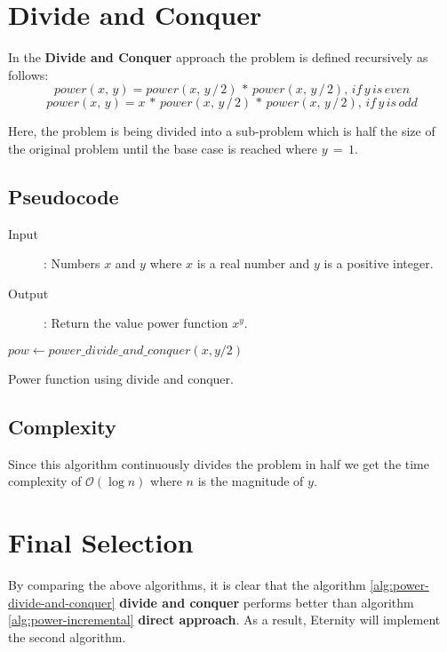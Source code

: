 \documentclass[11pt,a4paper]{report}
\theoremstyle{definition}
\theoremstyle{remark}
\begin{document}
        \clearpage

        \section{Divide and Conquer}
        In the \textbf{Divide and Conquer} approach the problem is defined recursively as follows:
            $$power(x, \, y) = power(x, \, y \, / \, 2) \, * \, power(x, \, y \, / \, 2), \, if \, y \, is \, even$$
            $$power(x, \, y) = x \, * \, power(x, \, y \, / \, 2) \, * \, power(x, \, y \, / \, 2), \, if \, y \, is \, odd$$
        
        Here, the problem is being divided into a sub-problem which is half the size of the original problem until the base case is reached where $y \, = \, 1.$
        
            \subsection{Pseudocode}
            	\begin{description}
                	\item [Input]: Numbers $x$ and $y$ where $x$ is a real number and $y$ is a positive integer.
                	\item [Output]: Return the value power function $x^y$.
            	\end{description}
            	
            	\begin{algorithm}
                        
                        $pow \gets power\_divide\_and\_conquer(x, y / 2)$\;
                        
                \caption{Power function using divide and conquer.}
                \label{alg:power-divide-and-conquer}
            	\end{algorithm}
            
            \subsection{Complexity}
            Since this algorithm continuously divides the problem in half we get the time complexity of $\mathcal{O}(\log n)$ where $n$ is the magnitude of $y$.

        \section{Final Selection}
        By comparing the above algorithms, it is clear that the algorithm \ref{alg:power-divide-and-conquer} \textbf{divide and conquer} performs better than algorithm \ref{alg:power-incremental} \textbf{direct approach}. As a result, Eternity will implement the second algorithm.    
        \clearpage
        
\end{document}
